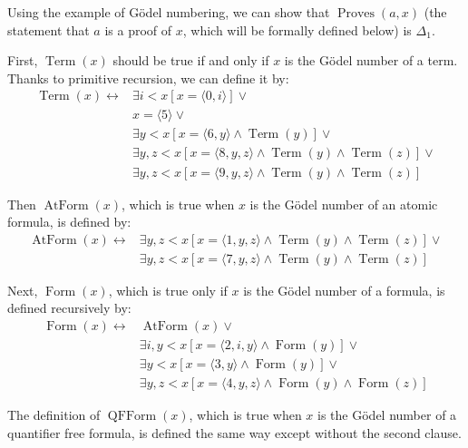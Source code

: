 \documentclass[12pt]{article}
\begin{document}
Using the example of G\"odel numbering, we can show that $\operatorname{Proves}(a,x)$ (the statement that $a$ is a proof of $x$, which will be formally defined below) is $\Delta_1$.

First, $\operatorname{Term}(x)$ should be true if and only if $x$ is the G\"odel number of a term.  Thanks to primitive recursion, we can define it by:
\begin{align*}
\operatorname{Term}(x)\leftrightarrow
&\exists i< x[x=\langle 0,i\rangle]\vee\\
&x=\langle 5\rangle \vee\\
&\exists y<x[x=\langle 6,y\rangle \wedge \operatorname{Term}(y)]\vee\\
&\exists y,z<x[x=\langle 8,y,z\rangle\wedge \operatorname{Term}(y)\wedge\operatorname{Term}(z)]\vee\\
&\exists y,z<x[x=\langle 9,y,z\rangle\wedge \operatorname{Term}(y)\wedge\operatorname{Term}(z)]
\end{align*}

Then $\operatorname{AtForm}(x)$, which is true when $x$ is the G\"odel number of an atomic formula, is defined by:
\begin{align*}
\operatorname{AtForm}(x)\leftrightarrow
&\exists y,z<x[x=\langle 1,y,z\rangle\wedge \operatorname{Term}(y)\wedge\operatorname{Term}(z)]\vee\\
&\exists y,z<x[x=\langle 7,y,z\rangle\wedge \operatorname{Term}(y)\wedge\operatorname{Term}(z)] %
\end{align*}

Next, $\operatorname{Form}(x)$, which is true only if $x$ is the G\"odel number of a formula, is defined recursively by:
\begin{align*}
\operatorname{Form}(x)\leftrightarrow
&\operatorname{AtForm}(x)\vee\\
&\exists i,y<x[x=\langle 2,i,y\rangle\wedge \operatorname{Form}(y)]\vee\\
&\exists y<x[x=\langle 3,y\rangle\wedge \operatorname{Form}(y)]\vee\\
&\exists y,z<x[x=\langle 4,y,z\rangle\wedge \operatorname{Form}(y)\wedge\operatorname{Form}(z)]
\end{align*}

The definition of $\operatorname{QFForm}(x)$, which is true when $x$ is the G\"odel number of a quantifier free formula, is defined the same way except without the second clause.
\end{document}
